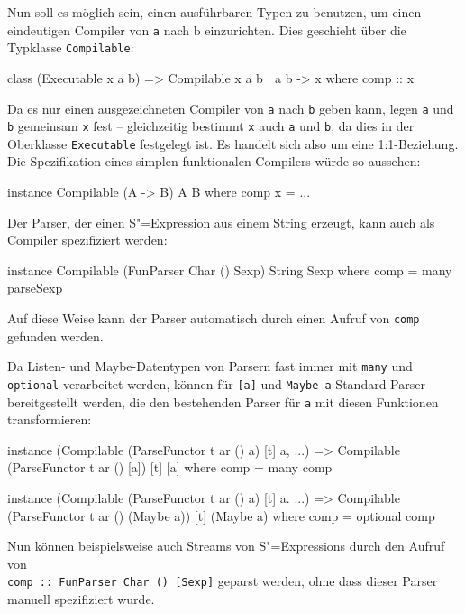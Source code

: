 \documentclass[12pt, a4paper, bibgerm]{scrbook}
\newenvironment{DIFnomarkup}{}{}
\newcommand\icode[1]{\lstinline?#1?}
\newcommand{\sexp}{S"=Expression}
\newcommand{\sexps}{S"=Expressions}
\begin{document}
Nun soll es möglich sein, einen ausführbaren Typen zu benutzen, um einen
eindeutigen Compiler von \icode{a} nach {b} einzurichten. Dies geschieht
über die Typklasse \icode{Compilable}:
\begin{DIFnomarkup}\begin{code}
class (Executable x a b) => Compilable x a b | a b -> x where
  comp :: x
\end{code}\end{DIFnomarkup}
Da es nur einen ausgezeichneten Compiler von \icode{a} nach \icode{b}
geben kann, legen \icode{a} und \icode{b} gemeinsam \icode{x} fest --
gleichzeitig bestimmt \icode{x} auch \icode{a} und \icode{b}, da dies in
der Oberklasse \icode{Executable} festgelegt ist. Es handelt sich also
um eine 1:1-Beziehung. Die Spezifikation eines simplen funktionalen
Compilers würde so aussehen:
\begin{DIFnomarkup}\begin{code}
instance Compilable (A -> B) A B where
  comp x = ...
\end{code}\end{DIFnomarkup}
Der Parser, der einen \sexp{} aus einem String erzeugt, kann auch als
Compiler spezifiziert werden:
\begin{DIFnomarkup}\begin{code}
instance Compilable (FunParser Char () Sexp) String Sexp where
  comp = many parseSexp
\end{code}\end{DIFnomarkup}
Auf diese Weise kann der Parser automatisch durch einen Aufruf von
\icode{comp} gefunden werden.

Da Listen- und Maybe-Datentypen von Parsern fast immer mit \icode{many}
und \icode{optional} verarbeitet werden, können für \icode{[a]} und
\icode{Maybe a} Standard-Parser bereitgestellt werden, die den
bestehenden Parser für \icode{a} mit diesen Funktionen transformieren:
\begin{DIFnomarkup}\begin{code}
instance (Compilable (ParseFunctor t ar () a) [t] a, ...) =>
  Compilable (ParseFunctor t ar () [a]) [t] [a] where
    comp = many comp

instance (Compilable (ParseFunctor t ar () a) [t] a. ...) =>
  Compilable (ParseFunctor t ar () (Maybe a)) [t] (Maybe a) where
    comp = optional comp
\end{code}\end{DIFnomarkup}
Nun können beispielsweise auch Streams von \sexps{} durch den Aufruf von
\\ \icode{comp :: FunParser Char () [Sexp]} geparst werden, ohne dass dieser
  Parser manuell spezifiziert wurde.
\end{document}
